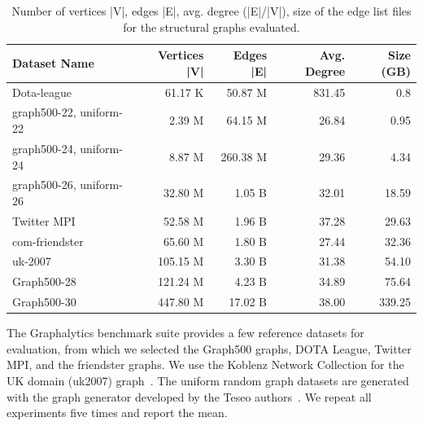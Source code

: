 \begin{table}[h!]
  \footnotesize
  \begin{tabular*}{\columnwidth}{@{\extracolsep{\fill}}lrrrr@{}}
  \toprule
  Dataset Name &
    Vertices |V| &
    Edges |E| &
    Avg. Degree &
    Size (GB) \\ \midrule
  Dota-league             & 61.17 K  & 50.87 M  & 831.45 & 0.8    \\
  graph500-22, uniform-22 & 2.39 M   & 64.15 M  & 26.84  & 0.95   \\
  graph500-24, uniform-24 & 8.87 M   & 260.38 M & 29.36  & 4.34   \\
  graph500-26, uniform-26 & 32.80 M  & 1.05 B   & 32.01  & 18.59  \\
  Twitter MPI             & 52.58 M  & 1.96 B   & 37.28  & 29.63  \\
  com-friendster          & 65.60 M  & 1.80 B   & 27.44  & 32.36  \\
  uk-2007                 & 105.15 M & 3.30 B   & 31.38  & 54.10  \\
  Graph500-28             & 121.24 M & 4.23 B   & 34.89  & 75.64  \\
  Graph500-30             & 447.80 M & 17.02 B  & 38.00  & 339.25 \\ \bottomrule
  \end{tabular*}
  \caption{Number of vertices |V|, edges |E|, avg. degree (|E|/|V|), size of the edge list
  files for the structural graphs evaluated.}
  \label{tab:datasets}
  \end{table}
The Graphalytics benchmark suite provides a few reference datasets for evaluation, from which we selected the Graph500 graphs, DOTA League, Twitter MPI, and the friendster graphs.
We use the Koblenz Network Collection for the UK domain (uk2007) graph~\cite{kunegis2013konect}.
The uniform random graph datasets are generated with the graph generator developed by the Teseo authors~\cite{teseo2021deLeo}.
We repeat all experiments five times and report the mean.




